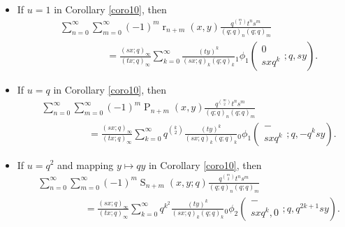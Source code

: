 \documentclass{cimart}
\DeclareMathOperator{\opP}{P}
\DeclareMathOperator{\opr}{r}
\DeclareMathOperator{\opS}{S}
\begin{document}
\begin{itemize}
    \item
If $u=1$ in Corollary \ref{coro10}, then
\begin{align}
    &\sum_{n=0}^{\infty}\sum_{m=0}^{\infty}(-1)^m\opr_{n+m}(x,y)\frac{q^{\binom{m}{2}}t^{n}s^{m}}{(q;q)_{n}(q;q)_{m}}\nonumber\\
        &\hspace{2cm}=\frac{(sx;q)_{\infty}}{(tx;q)_{\infty}}\sum_{k=0}^{\infty}\frac{(ty)^k}{(sx;q)_{k}(q;q)_{k}}{}_{1}\phi_{1}\left(
        \begin{array}{c}
             0 \\
             sxq^k
        \end{array};
        q,sy
        \right).
\end{align}

    \item 
If $u=q$ in Corollary \ref{coro10}, then
\begin{align}
    &\sum_{n=0}^{\infty}\sum_{m=0}^{\infty}(-1)^m\opP_{n+m}(x,y)\frac{q^{\binom{m}{2}}t^{n}s^{m}}{(q;q)_{n}(q;q)_{m}}\nonumber\\
        &\hspace{2cm}=\frac{(sx;q)_{\infty}}{(tx;q)_{\infty}}\sum_{k=0}^{\infty}q^{\binom{k}{2}}\frac{(ty)^k}{(sx;q)_{k}(q;q)_{k}}{}_{0}\phi_{1}\left(
        \begin{array}{c}
             - \\
             sxq^k
        \end{array};
        q,-q^ksy
        \right).
\end{align}

    \item 
If $u=q^2$ and mapping $y\mapsto qy$ in Corollary \ref{coro10}, then
\begin{align}
    &\sum_{n=0}^{\infty}\sum_{m=0}^{\infty}(-1)^m\opS_{n+m}(x,y;q)\frac{q^{\binom{m}{2}}t^{n}s^{m}}{(q;q)_{n}(q;q)_{m}}\nonumber\\
        &\hspace{2cm}=\frac{(sx;q)_{\infty}}{(tx;q)_{\infty}}\sum_{k=0}^{\infty}q^{k^2}\frac{(ty)^k}{(sx;q)_{k}(q;q)_{k}}{}_{0}\phi_{2}\left(
        \begin{array}{c}
             - \\
             sxq^k,0
        \end{array};
        q,q^{2k+1}sy
        \right).
\end{align}


\end{itemize}
\end{document}
